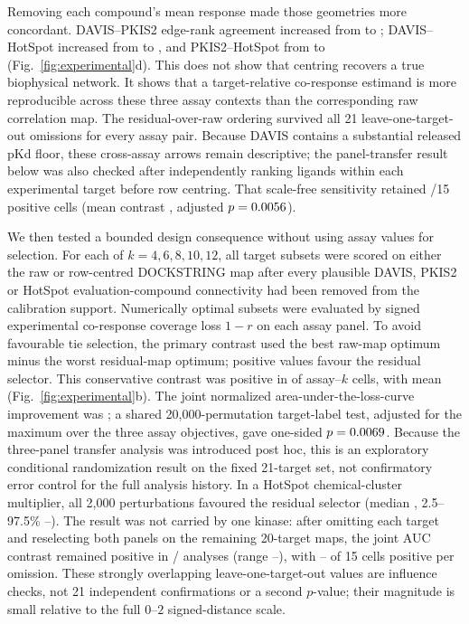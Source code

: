 \documentclass[11pt]{article}
\begin{document}
Removing each compound's mean response made those geometries more concordant.
DAVIS--PKIS2 edge-rank agreement increased from
\ExperimentalCrossRawRho{} to \ExperimentalCrossRho{}; DAVIS--HotSpot increased
from \DavisHotspotRawRho{} to \DavisHotspotResidualRho{}, and PKIS2--HotSpot
from \PkistwoHotspotRawRho{} to \PkistwoHotspotResidualRho{}
(Fig.~\ref{fig:experimental}d). This does not show that centring recovers a true
biophysical network. It shows that a target-relative co-response estimand is
more reproducible across these three assay contexts than the corresponding raw
correlation map. The residual-over-raw ordering survived all 21
leave-one-target-out omissions for every assay pair. Because DAVIS contains a
substantial released pKd floor, these cross-assay arrows remain descriptive;
the panel-transfer result below was also checked after independently ranking
ligands within each experimental target before row centring. That scale-free
sensitivity retained \PanelRankPositiveCells{}/15 positive cells (mean
contrast \PanelRankConservativeMean{}, adjusted $p=0.0056{}$).

We then tested a bounded design consequence without using assay values for
selection. For each of $k=4,6,8,10,12$, all target subsets were scored on either
the raw or row-centred DOCKSTRING map after every plausible DAVIS, PKIS2 or
HotSpot evaluation-compound connectivity had been removed from the calibration
support. Numerically optimal subsets were evaluated by signed experimental
co-response coverage loss $1-r$ on each assay panel. To avoid favourable tie
selection, the primary contrast used the best raw-map optimum minus the worst
residual-map optimum; positive values favour the residual selector. This
conservative contrast was positive in \PanelTransferPositiveCells{} of
\PanelTransferTotalCells{} assay--$k$ cells, with mean
\PanelTransferConservativeMean{} (Fig.~\ref{fig:experimental}b). The joint
normalized area-under-the-loss-curve improvement was \PanelTransferJointAUC{};
a shared 20,000-permutation target-label test, adjusted for the maximum over the
three assay objectives, gave one-sided $p=0.0069{}$. Because the
three-panel transfer analysis was introduced post hoc, this is an exploratory
conditional randomization result on the fixed 21-target set, not confirmatory
error control for the full analysis history. In a HotSpot
chemical-cluster multiplier, all 2,000 perturbations favoured the residual
selector (median \HotspotClusterMedian{}, 2.5--97.5\%
\HotspotClusterLow{}--\HotspotClusterHigh{}).
The result was not carried by one kinase: after omitting each target and
reselecting both panels on the remaining 20-target maps, the joint AUC contrast
remained positive in \PanelTargetLooPositive{}/\PanelTargetLooTotal{} analyses
(range \PanelTargetLooAucLow{}--\PanelTargetLooAucHigh{}), with
\PanelTargetLooCellWinsLow{}--\PanelTargetLooCellWinsHigh{} of 15 cells
positive per omission. These strongly overlapping leave-one-target-out values
are influence checks, not 21 independent confirmations or a second $p$-value;
their magnitude is small relative to the full $0$--$2$ signed-distance scale.
\end{document}
